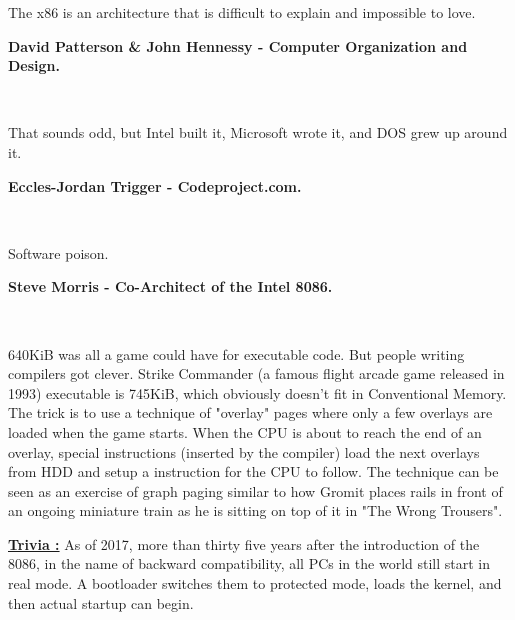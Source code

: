 \documentclass[book.tex]{subfiles}
\begin{document}
\par
 \begin{fancyquotes}
   The x86 is an architecture that is difficult to explain and impossible to love.\\
   \par
\textbf{David Patterson \& John Hennessy - Computer Organization and Design.}
 \end{fancyquotes}\\

\par

\par
 \begin{fancyquotes}
    That sounds odd, but Intel built it, Microsoft wrote it, and DOS grew up around it.\\
   \par
\textbf{Eccles-Jordan Trigger - Codeproject.com.}
 \end{fancyquotes}\\
\par
 \begin{fancyquotes}
    Software poison.\\
   \par
\textbf{Steve Morris - Co-Architect of the Intel 8086.}
 \end{fancyquotes}\\


\par
{} 640KiB was all a game could have for executable code. But people writing compilers got clever. Strike Commander (a famous flight arcade game released in 1993) executable is 745KiB, which obviously doesn't fit in Conventional Memory. The trick is to use a technique of "overlay" pages where only a few overlays are loaded when the game starts. When the CPU is about to reach the end of an overlay, special instructions (inserted by the compiler) load the next overlays from HDD and setup a  instruction for the CPU to follow. The technique can be seen as an exercise of graph paging similar to how Gromit places rails in front of an ongoing miniature train as he is sitting on top of it in "The Wrong Trousers".\\
\par

\textbf{\underline{Trivia :}}  As of 2017, more than thirty five years after the introduction of the 8086, in the name of backward compatibility, all PCs in the world still start in real mode. A bootloader switches them to protected mode, loads the kernel, and then actual startup can begin.
\end{document}
